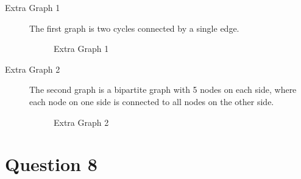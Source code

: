 \documentclass{article}
\begin{document}
\begin{description}
    \item[Extra Graph 1] The first graph is two cycles connected by a single edge.
    
    \begin{figure}[H]
        \centering
        \resizebox{0.5\textwidth}{!}{%
            
        }
        \caption{Extra Graph 1}
        \label{fig:extra_graph_1}
    \end{figure}

    \item[Extra Graph 2] The second graph is a bipartite graph with 5 nodes on each side, where each node on one side is connected to all nodes on the other side.
    
    \begin{figure}[H]
        \centering
        \resizebox{0.4\textwidth}{!}{%
            
        }
        \caption{Extra Graph 2}
        \label{fig:extra_graph_2}
    \end{figure}
\end{description}

\section{Question 8}
\end{document}
